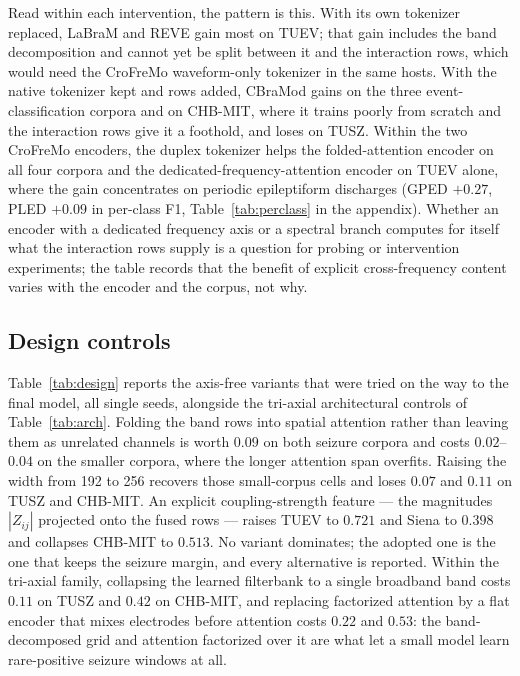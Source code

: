 Read within each intervention, the pattern is this. With its own
tokenizer replaced, LaBraM and REVE gain most on TUEV; that gain includes
the band decomposition and cannot yet be split between it and the
interaction rows, which would need the CroFreMo waveform-only tokenizer
in the same hosts. With the native tokenizer kept and rows added, CBraMod
gains on the three event-classification corpora and on CHB-MIT, where it
trains poorly from scratch and the interaction rows give it a foothold,
and loses on TUSZ. Within the two CroFreMo encoders, the duplex tokenizer
helps the folded-attention encoder on all four corpora and the
dedicated-frequency-attention encoder on TUEV alone, where the gain
concentrates on periodic epileptiform discharges (GPED $+0.27$, PLED
$+0.09$ in per-class F1, Table~\ref{tab:perclass} in the appendix).
Whether an encoder with a dedicated frequency axis or a spectral branch
computes for itself what the interaction rows supply is a question for
probing or intervention experiments; the table records that the benefit
of explicit cross-frequency content varies with the encoder and the
corpus, not why.

\subsection{Design controls}
\label{sec:design}

Table~\ref{tab:design} reports the axis-free variants that were tried on
the way to the final model, all single seeds, alongside the tri-axial
architectural controls of Table~\ref{tab:arch}. Folding the band rows
into spatial attention rather than leaving them as unrelated channels is
worth $0.09$ on both seizure corpora and costs $0.02$--$0.04$ on the
smaller corpora, where the longer attention span overfits. Raising the
width from 192 to 256 recovers those small-corpus cells and loses
$0.07$ and $0.11$ on TUSZ and CHB-MIT. An explicit coupling-strength
feature --- the magnitudes $|Z_{ij}|$ projected onto the fused rows ---
raises TUEV to $0.721$ and Siena to $0.398$ and collapses CHB-MIT to
$0.513$. No variant dominates; the adopted one is the one that keeps the
seizure margin, and every alternative is reported. Within the tri-axial
family, collapsing the learned filterbank to a single broadband band
costs $0.11$ on TUSZ and $0.42$ on CHB-MIT, and replacing factorized
attention by a flat encoder that mixes electrodes before attention costs
$0.22$ and $0.53$: the band-decomposed grid and attention factorized over
it are what let a small model learn rare-positive seizure windows at all.

